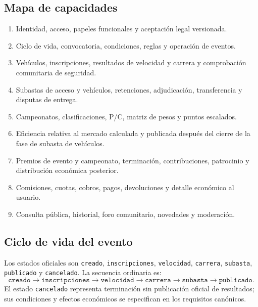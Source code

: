 \documentclass[10pt,letterpaper]{article}
\begin{document}
\subsection{Mapa de capacidades}
\begin{enumerate}
\item Identidad, acceso, papeles funcionales y aceptación legal versionada.
\item Ciclo de vida, convocatoria, condiciones, reglas y operación de eventos.
\item Vehículos, inscripciones, resultados de velocidad y carrera y comprobación comunitaria de seguridad.
\item Subastas de acceso y vehículos, retenciones, adjudicación, transferencia y disputas de entrega.
\item Campeonatos, clasificaciones, P/C, matriz de pesos y puntos escalados.
\item Eficiencia relativa al mercado calculada y publicada después del cierre de la fase de subasta de vehículos.
\item Premios de evento y campeonato, terminación, contribuciones, patrocinio y distribución económica posterior.
\item Comisiones, cuotas, cobros, pagos, devoluciones y detalle económico al usuario.
\item Consulta pública, historial, foro comunitario, novedades y moderación.
\end{enumerate}

\subsection{Ciclo de vida del evento}
Los estados oficiales son \texttt{creado}, \texttt{inscripciones}, \texttt{velocidad}, \texttt{carrera}, \texttt{subasta}, \texttt{publicado} y \texttt{cancelado}. La secuencia ordinaria es:
\[
\texttt{creado}\rightarrow\texttt{inscripciones}\rightarrow\texttt{velocidad}\rightarrow\texttt{carrera}\rightarrow\texttt{subasta}\rightarrow\texttt{publicado}.
\]
El estado \texttt{cancelado} representa terminación sin publicación oficial de resultados; sus condiciones y efectos económicos se especifican en los requisitos canónicos.
\end{document}
